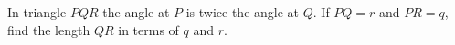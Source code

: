 In triangle $PQR$ the angle at $P$ is twice the angle at $Q$. If $PQ=r$ and $PR=q$, find the length $QR$ in terms of $q$ and $r$.

